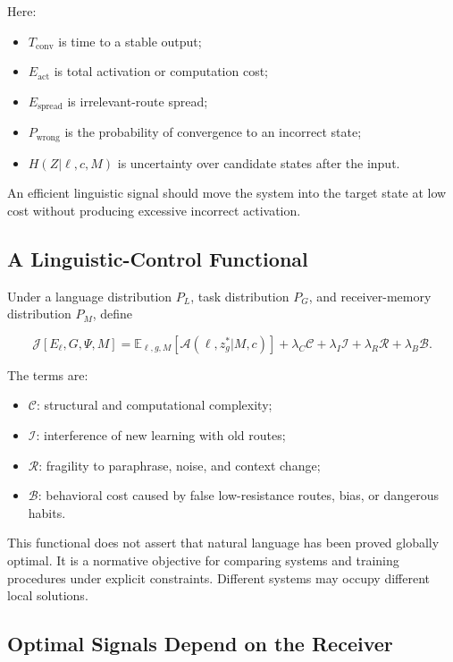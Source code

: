 \documentclass[11pt, a4paper]{article}
\begin{document}
Here:


\begin{itemize}
\item $T_{\text{conv}}$ is time to a stable output;
\item $E_{\text{act}}$ is total activation or computation cost;
\item $E_{\text{spread}}$ is irrelevant-route spread;
\item $P_{\text{wrong}}$ is the probability of convergence to an incorrect state;
\item $H(Z|\ell,c,M)$ is uncertainty over candidate states after the input.
\end{itemize}


An efficient linguistic signal should move the system into the target state at low cost without producing excessive incorrect activation.


\subsection{A Linguistic-Control Functional}


Under a language distribution $P_L$, task distribution $P_G$, and receiver-memory distribution $P_M$, define


\[
\mathcal{J}[E_\ell,G,\Psi,M]
=
\mathbb{E}_{\ell,g,M}
\left[
\mathcal{A}(\ell,z^*_g|M,c)
\right]
+\lambda_C\mathcal{C}
+\lambda_I\mathcal{I}
+\lambda_R\mathcal{R}
+\lambda_B\mathcal{B}.
\tag{8}
\]

The terms are:


\begin{itemize}
\item $\mathcal{C}$: structural and computational complexity;
\item $\mathcal{I}$: interference of new learning with old routes;
\item $\mathcal{R}$: fragility to paraphrase, noise, and context change;
\item $\mathcal{B}$: behavioral cost caused by false low-resistance routes, bias, or dangerous habits.
\end{itemize}


This functional does not assert that natural language has been proved globally optimal. It is a normative objective for comparing systems and training procedures under explicit constraints. Different systems may occupy different local solutions.


\subsection{Optimal Signals Depend on the Receiver}
\end{document}

